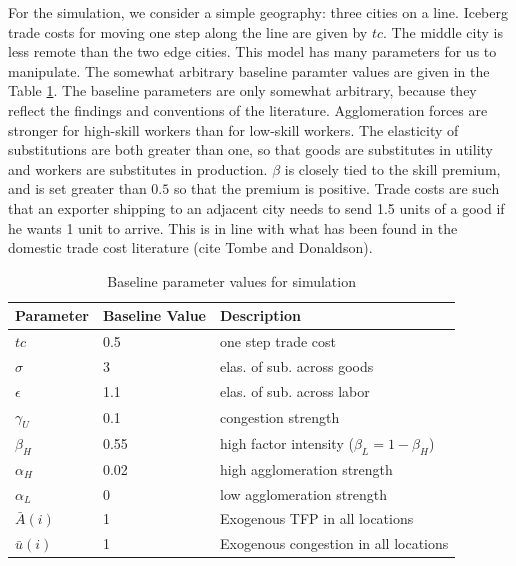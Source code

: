 \documentclass{article}
\begin{document}
For the simulation, we consider a simple geography: three cities on a line.  Iceberg trade costs for moving one step along the line are given by $tc$.  The middle city is less remote than the two edge cities.  This model has many parameters for us to manipulate.  The somewhat arbitrary baseline paramter values are given in the Table \ref{tab:baseline}.  The baseline parameters are only somewhat arbitrary, because they reflect the findings and conventions of the literature.  Agglomeration forces are stronger for high-skill workers than for low-skill workers.  The elasticity of substitutions are both greater than one, so that goods are substitutes in utility and workers are substitutes in production.  $\beta$ is closely tied to the skill premium, and is set greater than $0.5$ so that the premium is positive.  Trade costs are such that an exporter shipping to an adjacent city needs to send 1.5 units of a good if he wants 1 unit to arrive.  This is in line with what has been found in the domestic trade cost literature (cite Tombe and Donaldson).

    \begin{table}
        \centering
        \begin{tabular}{lll}
           \hline \hline
           Parameter    & Baseline Value & Description                                     \\ \hline
           $tc$         & 0.5            & one step trade cost                             \\
           $\sigma$     & 3              & elas. of sub. across goods                      \\
           $\epsilon$   & 1.1            & elas. of sub. across labor                      \\
           $\gamma_U$   & 0.1            & congestion strength                             \\
           $\beta_H$    & 0.55           & high factor intensity ($\beta_L = 1 - \beta_H$) \\
           $\alpha_H$   & 0.02           & high agglomeration strength                     \\
           $\alpha_L$   & 0              & low agglomeration strength                      \\
           $\bar{A}(i)$ & 1              & Exogenous TFP in all locations                  \\
           $\bar{u}(i)$ & 1              & Exogenous congestion in all locations           \\ \hline
        \end{tabular}
        \caption{Baseline parameter values for simulation}
        \label{tab:baseline}
    \end{table}
\end{document}
